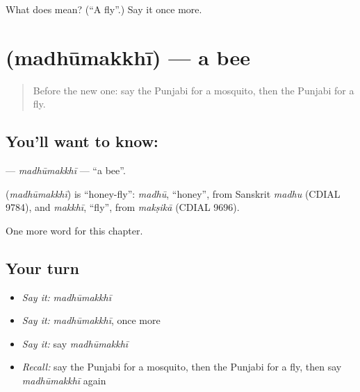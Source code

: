 \begin{tcolorbox}[breakable,colback=teal!4,colframe=teal!35!black,title={Before you move on}]
What does  mean? (\textquotedblleft{}A fly\textquotedblright{}.) Say it once more.
\end{tcolorbox}
\section[\texorpdfstring{\pa{ਮਧੂਮੱਖੀ} (madhūmakkhī)}{ਮਧੂਮੱਖੀ (madhūmakkhī)}]{ (madhūmakkhī) — a bee}

\label{lesson:PA-C132-madhumakkhi}



\begin{quote}
Before the new one: say the Punjabi for a mosquito, then the Punjabi for a fly.
\end{quote}

\subsection*{You'll want to know: }
\textbf{} — \emph{madhūmakkhī} — \textquotedblleft{}a bee\textquotedblright{}.

\begin{cousinweb}
\textbf{} (\emph{madhūmakkhī}) is \textquotedblleft{}honey-fly\textquotedblright{}: \emph{madhū}, \textquotedblleft{}honey\textquotedblright{}, from Sanskrit \emph{madhu} (CDIAL 9784), and \emph{makkhī}, \textquotedblleft{}fly\textquotedblright{}, from \emph{makṣikā} (CDIAL 9696).
\end{cousinweb}

\begin{grammarlens}[title={What you've built}]
One more word for this chapter.
\end{grammarlens}

\subsection*{Your turn}
\begin{itemize}
\raggedright
  \item \emph{Say it:} \emph{madhūmakkhī}
  \item \emph{Say it:} \emph{madhūmakkhī}, once more
  \item \emph{Say it:} say \emph{madhūmakkhī}
  \item \emph{Recall:} say the Punjabi for a mosquito, then the Punjabi for a fly, then say \emph{madhūmakkhī} again
\end{itemize}

